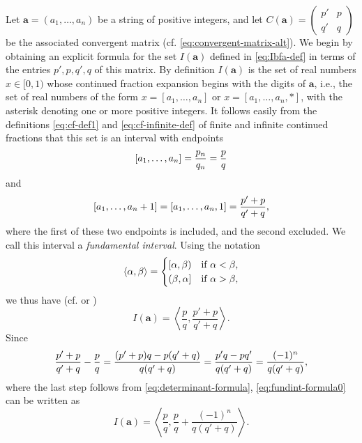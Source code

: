 \documentclass[10pt]{article}
\theoremstyle{definition}
\numberwithin{equation}{section}
\numberwithin{lemma}{section}
\newcommand{\bfa}{\mathbf{a}}
\newcommand{\Fundint}[1]{\left\langle #1\right\rangle}
\begin{document}
Let $\bfa=(a_1,\dots,a_n)$ be a string of positive integers, and let 
$C(\bfa)=\left(\begin{smallmatrix} p'&p\\q'&q\end{smallmatrix}\right)$ 
be the associated convergent matrix (cf.  \eqref{eq:convergent-matrix-alt}).
We begin by obtaining an explicit formula for the set $I(\bfa)$ defined
in \eqref{eq:Ibfa-def} in terms of the entries $p',p,q',q$ 
of this matrix. 
By definition $I(\bfa)$ is the set of real
numbers $x\in[0,1)$ whose continued fraction expansion begins with the
digits of $\bfa$, 
i.e., the set of real numbers of the form $x=[a_1,\dots,a_n]$ or
$x=[a_1,\dots,a_n,*]$, 
with the asterisk denoting one or more positive integers. 
It follows easily from the definitions \eqref{eq:cf-def1} and
\eqref{eq:cf-infinite-def} of finite and infinite continued fractions 
that this set is an interval
with endpoints 
\begin{equation}
\notag
[a_1,\dots,a_n]=\frac{p_n}{q_n}=\frac{p}{q}
\end{equation}
and 
\begin{equation}
\notag
[a_1,\dots,a_n+1]=[a_1,\dots,a_n,1]=\frac{p'+p}{q'+q},
\end{equation}
where the first of these two endpoints is included, and the second
excluded.  We call this interval a \emph{fundamental interval}.  
Using the notation
\begin{equation}
\notag
\Fundint{\alpha,\beta}=
\begin{cases} 
[\alpha,\beta) & \text{if $\alpha< \beta$,}
\\
(\beta,\alpha] & \text{if $\alpha>\beta$,}
\end{cases}
\end{equation}
we thus have (cf. \cite[(3.6)]{neverending-fractions-book} or 
\cite[Ex.~1.3.15]{dajani-kraaikamp-book})
\begin{equation}
\label{eq:fundint-formula0}
I(\bfa)=
\Fundint{\frac{p}{q},\frac{p'+p}{q'+q}}.
\end{equation}
Since
\begin{equation}
\notag
\frac{p'+p}{q'+q}-\frac{p}{q} = \frac{(p'+p)q-p(q'+q)}{q(q'+q)}
=\frac{p'q-pq'}{q(q'+q)}=\frac{(-1)^n}{q(q'+q)},
\end{equation}
where the last step follows from \eqref{eq:determinant-formula},
\eqref{eq:fundint-formula0} can be written as 
\begin{equation}
\label{eq:fundint-formula1}
I(\bfa)=
\Fundint{\frac{p}{q},\frac{p}{q}+\frac{(-1)^n}{q(q'+q)}}.
\end{equation}
\end{document}
